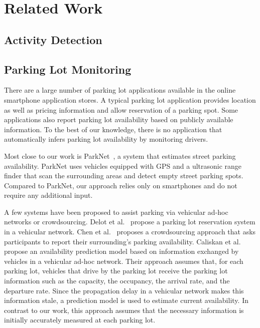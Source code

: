 \section{Related Work}
\label{sec-related}

\subsection{Activity Detection}

\subsection{Parking Lot Monitoring}

There are a large number of parking lot applications available in the online
smartphone application stores. A typical parking lot application provides
location as well as pricing information and allow reservation of a parking spot.
Some applications also report parking lot availability based on publicly
available information. To the best of our knowledge, there is no application
that automatically infers parking lot availability by monitoring drivers.

Most close to our work is ParkNet~\cite{Mathur:2010:PDS}, a system that
estimates street parking availability. ParkNet uses vehicles equipped with GPS
and a ultrasonic range finder that scan the surrounding areas and detect
empty street parking spots. Compared to ParkNet, our approach relies only on
smartphones and do not require any additional input.

A few systems have been proposed to assist parking via vehicular ad-hoc
networks or crowdsourcing. Delot et al.~\cite{Delot:2009:CRP} propose a parking
lot reservation system in a vehicular network. Chen et al.~\cite{Chen:2012:COS}
proposes a crowdsourcing approach that asks participants to report their
surrounding's parking availability. Caliskan et al.~\cite{4212497} propose an
availability prediction model based on information exchanged by vehicles in a
vehicular ad-hoc network. Their approach assumes that, for each parking lot,
vehicles that drive by the parking lot receive the parking lot information such
as the capacity, the occupancy, the arrival rate, and the departure rate. Since
the propagation delay in a vehicular network makes this information stale, a
prediction model is used to estimate current availability. In contrast to
our work, this approach assumes that the necessary information is initially
accurately measured at each parking lot.

